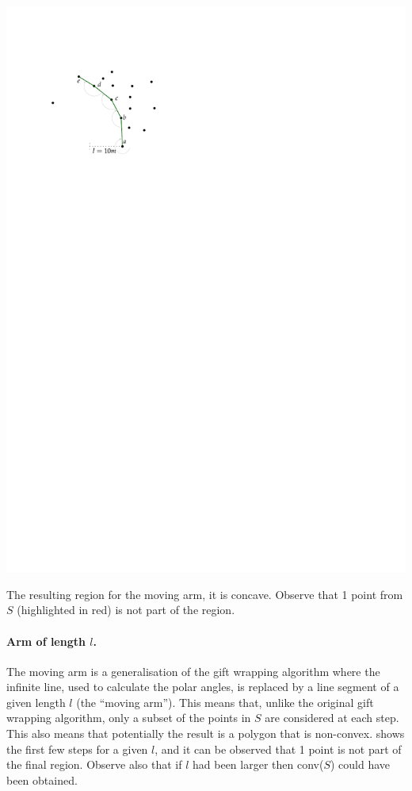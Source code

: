 \begin{marginfigure}
  \centering
  \includegraphics[page=3,width=.9\textwidth]{figs/movingarm.pdf}
  \caption{The resulting region for the moving arm, it is concave. Observe that 1 point from $S$ (highlighted in red) is not part of the region.}%
\end{marginfigure}

\paragraph{Arm of length $l$.} 
The moving arm is a generalisation of the gift wrapping algorithm where the infinite line, used to calculate the polar angles, is replaced by a line segment of a given length $l$ (the ``moving arm'').
This means that, unlike the original gift wrapping algorithm, only a subset of the points in $S$ are considered at each step.
This also means that potentially the result is a polygon that is non-convex.
 shows the first few steps for a given $l$, and it can be observed that 1 point is not part of the final region.
Observe also that if $l$ had been larger then conv($S$) could have been obtained.


